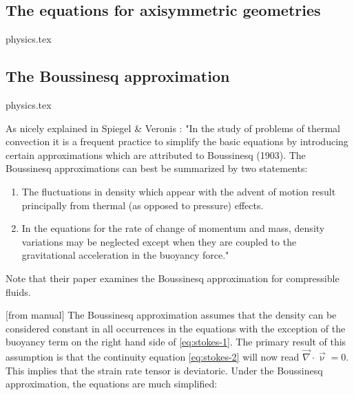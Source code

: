 
\subsection{The equations for axisymmetric geometries \label{ss:axicyleqs}}
\begin{flushright} {\tiny {\color{gray} physics.tex}} \end{flushright}



\newpage
\subsection{The Boussinesq approximation}
\begin{flushright} {\tiny {\color{gray} physics.tex}} \end{flushright}

As nicely explained in Spiegel \& Veronis \cite{spve60}: "In the study of problems of thermal convection it is a frequent practice to simplify the basic equations by introducing certain approximations which are attributed to
Boussinesq (1903). The Boussinesq approximations can best be summarized by two
statements: 
\begin{enumerate}
\item The fluctuations in density which appear with the advent of motion
result principally from thermal (as opposed to pressure) effects. 
\item In the equations
for the rate of change of momentum and mass, density variations may be neglected except
when they are coupled to the gravitational acceleration in the buoyancy force."
\end{enumerate}
Note that their paper examines the Boussinesq approximation for compressible fluids.  

[from \aspect{} manual]
The Boussinesq approximation assumes that the density can be
considered constant in all occurrences in the equations with the exception of
the buoyancy term on the right hand side of \eqref{eq:stokes-1}. The primary
result of this assumption is that the continuity equation \eqref{eq:stokes-2}
will now read ${\vec \nabla}\cdot{\vec \upnu} = 0$.
This implies that the strain rate tensor is deviatoric.
Under the Boussinesq approximation, the equations are much simplified:


